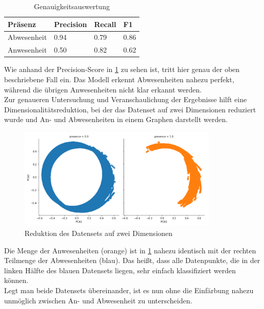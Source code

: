 \begin{center}
    \begin{table}[h]
        \centering
        \caption{Genauigkeitsauswertung}
        \begin{tabular}{|p{2.5cm}||p{1.8cm}|p{1.5cm}|p{1.5cm}|}
            \hline
            \hfill Präsenz&\hfill Precision &\hfill Recall &\hfill F1\\
            \hline
            \hline
            \hfill Abwesenheit&\hfill 0.94&\hfill 0.79&\hfill 0.86\\
            \hfill Anwesenheit&\hfill 0.50&\hfill 0.82&\hfill 0.62\\
            \hline
        \end{tabular}          
        \label{tab:clus}
    \end{table}
\end{center}

Wie anhand der Precision-Score in \ref{tab:clus} zu sehen ist, tritt hier genau der oben beschriebene Fall ein.
Das Modell erkennt Abwesenheiten nahezu perfekt, während die übrigen Anwesenheiten nicht klar erkannt werden.\\
\newpage
Zur genaueren Untersuchung und Veranschaulichung der Ergebnisse hilft eine Dimensionalitätsreduktion, 
bei der das Datenset auf zwei Dimensionen reduziert wurde und An- und Abwesenheiten in einem Graphen darstellt werden.

\begin{figure}[h]
    \centering
    \includegraphics[width=0.85\textwidth]{pic/pca.png}
    \caption{Reduktion des Datensets auf zwei Dimensionen}
    \label{fig:pca}
\end{figure}

Die Menge der Anwesenheiten (orange) ist in \ref{fig:pca} nahezu identisch mit der rechten Teilmenge der 
Abwesenheiten (blau). 
Das heißt, dass alle Datenpunkte, die in der linken Hälfte des blauen Datensets liegen, sehr einfach klassifiziert 
werden können.\\
Legt man beide Datensets übereinander, ist es nun ohne die Einfärbung nahezu unmöglich zwischen An- und 
Abwesenheit zu unterscheiden.\\


